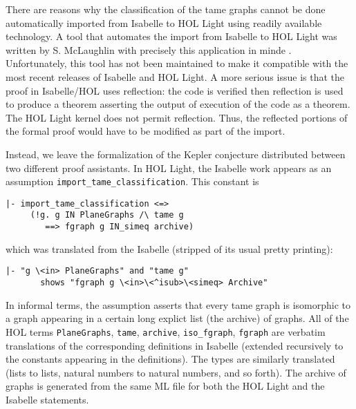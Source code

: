 There are reasons why the classification of the tame graphs cannot be done automatically imported from Isabelle to HOL Light
using readily available technology.   A tool that automates the import from Isabelle to HOL Light was written by
S. McLaughlin with precisely this application in minde \cite{XX}.  Unfortunately, this tool has not been maintained to make it
compatible with the most recent releases of Isabelle and HOL Light.   A more serious issue is that the proof in Isabelle/HOL uses
reflection:  the code is verified then reflection is used to produce a theorem asserting the output of execution of the code as
a theorem.   The HOL Light kernel does not permit reflection.  Thus, the reflected portions of the formal proof would have to be
modified as part of the import.

Instead, we leave the formalization of the Kepler conjecture distributed between two different proof assistants.
In HOL Light, the Isabelle work appears as an assumption
\verb!import_tame_classification!.  This constant is 


\begin{obeylines}

\begin{verbatim}
|- import_tame_classification <=>
     (!g. g IN PlaneGraphs /\ tame g 
        ==> fgraph g IN_simeq archive)
\end{verbatim}

\end{obeylines}

which was translated from the Isabelle (stripped of its usual pretty printing):

\begin{obeylines}

\begin{verbatim}
|- "g \<in> PlaneGraphs" and "tame g" 
       shows "fgraph g \<in>\<^isub>\<simeq> Archive"
\end{verbatim}

\end{obeylines}


In informal terms, the assumption asserts that every tame graph is isomorphic to a graph appearing in a certain
long explict list (the archive) of graphs.  All of the HOL terms \verb!PlaneGraphs!, \verb!tame!, \verb!archive!,
\verb!iso_fgraph!, \verb!fgraph! are verbatim translations of the corresponding definitions in Isabelle (extended
recursively to the constants appearing in the definitions).  The types are similarly translated (lists to lists, natural numbers
to natural numbers, and so forth).  The archive of graphs is generated from the same ML file for
both the HOL Light and the Isabelle statements.  

